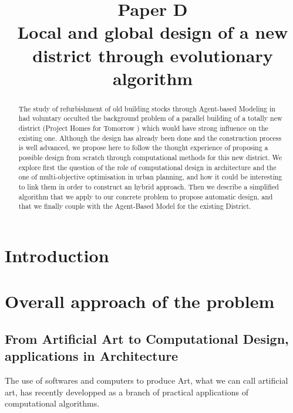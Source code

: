 \documentclass[english]{article}
\begin{document}
\title{Paper D\\
Local and global design of a new district through evolutionary algorithm}

\maketitle
\vspace{2cm}

\begin{abstract}
The study of refurbishment of old building stocks through Agent-based
Modeling in  had voluntary occulted the background problem of a parallel
building of a totally new district (Project Homes for Tomorrow )
which would have strong influence on the existing one. Although the
design has already been done and the construction process is well
advanced, we propose here to follow the thought experience of proposing
a possible design from scratch through computational methods for this
new district. We explore first the question of the role of computational
design in architecture and the one of multi-objective optimisation
in urban planning, and how it could be interesting to link them in
order to construct an hybrid approach. Then we describe a simplified
algorithm that we apply to our concrete problem to propose automatic
design, and that we finally couple with the Agent-Based Model for
the existing District.

\newpage{}
\end{abstract}

\section*{Introduction}


\section{Overall approach of the problem}


\subsection{From Artificial Art to Computational Design, applications in Architecture}

The use of softwares and computers to produce Art, what we can call
artificial art, has recently developped as a branch of practical applications
of computational algorithms.

\bigskip{}
\end{document}
